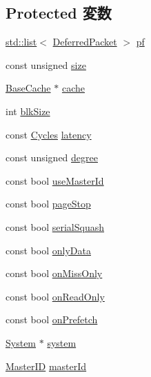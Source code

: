 \subsection*{Protected 変数}
\begin{DoxyCompactItemize}
\item 
\hyperlink{classstd_1_1list}{std::list}$<$ \hyperlink{classBasePrefetcher_1_1DeferredPacket}{DeferredPacket} $>$ \hyperlink{classBasePrefetcher_acdef622ce8eca64ce81e25e37f0bc22e}{pf}
\item 
const unsigned \hyperlink{classBasePrefetcher_ad3f1cf0299fe68eb9a68a7c67232c62d}{size}
\item 
\hyperlink{classBaseCache}{BaseCache} $\ast$ \hyperlink{classBasePrefetcher_a5cc08dee7231c774489c04728dd5f169}{cache}
\item 
int \hyperlink{classBasePrefetcher_a848be51480be2b992d8a262952268fbc}{blkSize}
\item 
const \hyperlink{classCycles}{Cycles} \hyperlink{classBasePrefetcher_a46b9d67ee437c6ecdbedca8ec8d2ed40}{latency}
\item 
const unsigned \hyperlink{classBasePrefetcher_aa05c9c27f3c02725fb1574fb5218aeba}{degree}
\item 
const bool \hyperlink{classBasePrefetcher_ab84f738213bbd5196080f894c0d5aaf2}{useMasterId}
\item 
const bool \hyperlink{classBasePrefetcher_a8e2ec9b566b10d5b73a5d9fe6a90b058}{pageStop}
\item 
const bool \hyperlink{classBasePrefetcher_a198469b16ef2d026a2ffa298eb77e616}{serialSquash}
\item 
const bool \hyperlink{classBasePrefetcher_a8762c4c2c983c8eadd6c7bccfe973f5f}{onlyData}
\item 
const bool \hyperlink{classBasePrefetcher_ade1681d5d6ad302db05a204fd920a110}{onMissOnly}
\item 
const bool \hyperlink{classBasePrefetcher_a009f56092b97c79cde580c4ae5e12599}{onReadOnly}
\item 
const bool \hyperlink{classBasePrefetcher_a632f5ff02feaeadf06e58c82f3fb43c3}{onPrefetch}
\item 
\hyperlink{classSystem}{System} $\ast$ \hyperlink{classBasePrefetcher_af27ccd765f13a4b7bd119dc7579e2746}{system}
\item 
\hyperlink{request_8hh_ac366b729262fd8e7cbd3283da6f775cf}{MasterID} \hyperlink{classBasePrefetcher_a96ec6a422ac492d05f8b3edc5b58532b}{masterId}
\end{DoxyCompactItemize}


